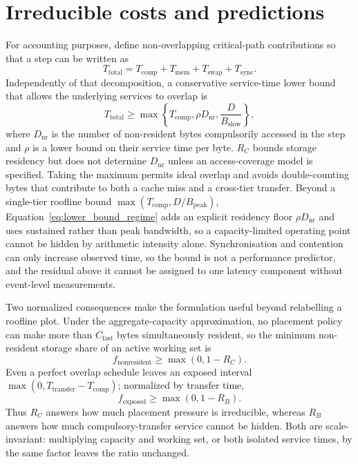 \section*{Irreducible costs and predictions}
\label{sec:model}

For accounting purposes, define non-overlapping critical-path contributions so
that a step can be written as
\begin{equation}
T_{\mathrm{total}}=T_{\mathrm{comp}}+T_{\mathrm{mem}}+
T_{\mathrm{swap}}+T_{\mathrm{sync}}.
\label{eq:latency_decomp}
\end{equation}
Independently of that decomposition, a conservative service-time lower bound
that allows the underlying services to overlap is
\begin{equation}
T_{\mathrm{total}}\geq
\max\!\left\{T_{\mathrm{comp}},
\rho D_{\mathrm{nr}},\frac{D}{B_{\mathrm{slow}}}\right\},
\label{eq:lower_bound_regime}
\end{equation}
where $D_{\mathrm{nr}}$ is the number of non-resident bytes compulsorily
accessed in the step and $\rho$ is a lower bound on their service time per byte.
$R_C$ bounds storage residency but does not determine $D_{\mathrm{nr}}$ unless
an access-coverage model is specified. Taking the maximum permits ideal overlap
and avoids double-counting bytes that contribute to both a cache miss and a
cross-tier transfer. Beyond a single-tier roofline bound
$\max(T_{\mathrm{comp}},D/B_{\mathrm{peak}})$,
Equation~\eqref{eq:lower_bound_regime} adds an explicit residency floor
$\rho D_{\mathrm{nr}}$ and uses sustained rather than peak bandwidth, so a
capacity-limited operating point cannot be hidden by arithmetic intensity alone.
Synchronisation and contention can only increase observed time, so the bound
is not a performance predictor, and the residual above it cannot be assigned to
one latency component without event-level measurements.

Two normalized consequences make the formulation useful beyond relabelling a
roofline plot. Under the aggregate-capacity approximation, no placement policy
can make more than $C_{\mathrm{fast}}$ bytes simultaneously resident, so the
minimum non-resident storage share of an active working set is
\begin{equation}
f_{\mathrm{nonresident}}\geq \max(0,1-R_C).
\label{eq:nonresident_fraction}
\end{equation}
Even a perfect overlap schedule leaves an exposed interval
$\max(0,T_{\mathrm{transfer}}-T_{\mathrm{comp}})$; normalized by transfer time,
\begin{equation}
f_{\mathrm{exposed}}\geq \max(0,1-R_B).
\label{eq:exposed_fraction}
\end{equation}
Thus $R_C$ answers how much placement pressure is irreducible, whereas $R_B$
answers how much compulsory-transfer service cannot be hidden. Both are
scale-invariant: multiplying capacity and working set, or both isolated service
times, by the same factor leaves the ratio unchanged.

